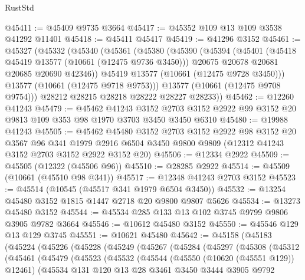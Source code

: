 \begin{lexlean}{RustStd}
\begin{coremodule}
@45411 := @45409 @9735 @3664
@45417 := @45352 @109 @13 @109 @3538 @41292 @11401
@45418 := @45411 @45417
@45419 := @41296 @3152
@45461 := @45327
    (@45332
      (@45340
        (@45361
          (@45380
            (@45390
              (@45394
                (@45401
                  (@45418 @45419 @13577 (@10661 (@12475 @9736 @3450)))
                  @20675
                  @20678
                  @20681
                  @20685
                  @20690
                  @42346))
              @45419
              @13577
              (@10661 (@12475 @9728 @3450)))
            @13577
            (@10661 (@12475 @9718 @9753)))
          @13577
          (@10661 (@12475 @9708 @9754)))
        @28212
        @28215
        @28218
        @28222
        @28227
        @28233))
@45462 := @12260 @41243
@45479 := @45462
    @41243
    @3152
    @2703
    @3152
    @2922
    @99
    @3152
    @20
    @9813
    @109
    @353
    @98
    @1970
    @3703
    @3450
    @3450
    @6310
@45480 := @19988 @41243
@45505 := @45462
    @45480
    @3152
    @2703
    @3152
    @2922
    @98
    @3152
    @20
    @3567
    @96
    @341
    @1979
    @2916
    @6504
    @3450
    @9800
    @9809
    (@12312 @41243 @3152 @2703 @3152 @2922 @3152 @20)
@45506 := @12334 @2922
@45509 := @45505 (@12322 (@45506 @96))
@45510 := @28285 @2922
@45514 := @45509 (@10661 (@45510 @98 @341))
@45517 := @12348 @41243 @2703 @3152
@45523 := @45514 (@10545 (@45517 @341 @1979 @6504 @3450))
@45532 := @13254 @45480 @3152 @1815 @1447 @2718 @20 @9800 @9807 @5626
@45534 := @13273 @45480 @3152
@45544 := @45534 @285 @133 @13 @102 @3745 @9799 @9806 @3905 @9782 @3664
@45546 := @10612 @45480 @3152
@45550 := @45546 @129 @13 @129 @3745
@45551 := @10621 @45480
@45642 := @45158
    (@45183
      (@45224
        (@45226
          (@45228
            (@45249
              (@45267
                (@45284
                  (@45297
                    (@45308
                      (@45312
                        (@45461
                          (@45479
                            (@45523
                              (@45532
                                (@45544
                                  (@45550 (@10620 (@45551 @129)) @12461)
                                  (@45534
                                    @131
                                    @120
                                    @13
                                    @28
                                    @3461
                                    @3450
                                    @3444
                                    @3905
                                    @9792

\end{coremodule}
\end{lexlean}
